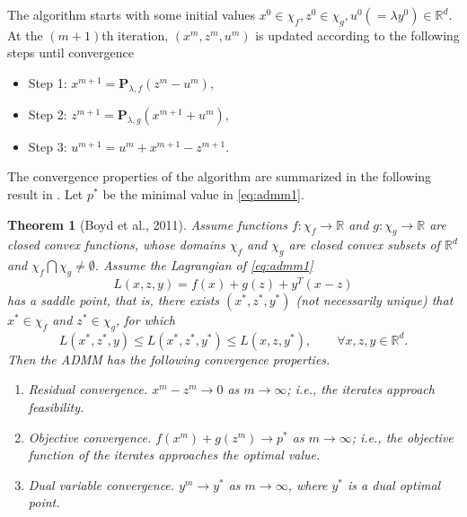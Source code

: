 \documentclass{article}
\newtheorem{theorem}{Theorem}[section]
\begin{document}
The algorithm starts with some initial values $x^0 \in \chi_f,
z^0 \in \chi_g, u^0 (=\lambda y^0) \in \mathbb{R}^d$.
At the $(m+1)$th iteration, $(x^m, z^m, u^m)$ is updated according to the following steps until convergence
\begin{itemize}
\item Step 1: $x^{m+1} = \mathbf{P}_{\lambda,f}(z^m - u^m)$,

\item Step 2: $z^{m+1} = \mathbf{P}_{\lambda,g}(x^{m+1} + u^m)$,

\item Step 3: $u^{m+1} = u^m + x^{m+1} - z^{m+1}$.

\end{itemize}
The convergence properties of the algorithm are summarized in the following result in \cite{boyd2011distributed}.
Let $p^\ast$ be the minimal value in \eqref{eq:admm1}.

\begin{theorem}[Boyd et al., 2011]
Assume functions $f: \chi_f \to \mathbb{R}$ and
$g: \chi_g \to \mathbb{R}$ are
closed convex functions, whose domains $\chi_f$ and $\chi_g$
are closed convex subsets of $\mathbb{R}^d$ and
$\chi_f \bigcap \chi_g \neq \emptyset$.
Assume the Lagrangian of \eqref{eq:admm1}
$$
L(x,z,y) = f(x) + g(z) + y^T(x-z)
$$
has a saddle point, that is, there exists $(x^\ast, z^\ast, y^\ast)$ (not necessarily unique) that $x^\ast \in \chi_f$ and
$z^\ast \in \chi_g$, for which
$$
L(x^\ast, z^\ast, y) \le L(x^\ast, z^\ast, y^\ast) \le
L(x, z, y^\ast), \qquad \forall x, z, y \in \mathbb{R}^d.
$$
Then the ADMM has the following convergence properties.
\begin{enumerate}
\item Residual convergence. $x^m - z^m \to 0$
as $m \to \infty$; i.e., the iterates approach feasibility.

\item Objective convergence. $f(x^m) + g(z^m) \to p^\ast$ as $m \to \infty$; i.e., the objective function of
the iterates approaches the optimal value.

\item Dual variable convergence. $y^m \to y^\ast$ as $m \to \infty$, where $y^\ast$ is a dual optimal point.

\end{enumerate}
\end{theorem}
\end{document}
